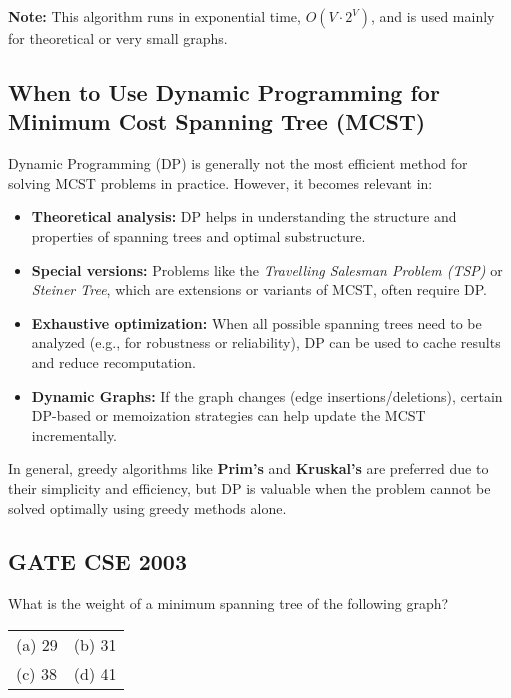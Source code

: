 \documentclass[a4paper,14pt]{extarticle}
\begin{document}
\vspace{1em}
\textbf{Note:} This algorithm runs in exponential time, \(O(V \cdot 2^V)\), and is used mainly for theoretical or very small graphs.

\newpage
\subsection{When to Use Dynamic Programming for Minimum Cost Spanning Tree (MCST)}

Dynamic Programming (DP) is generally not the most efficient method for solving MCST problems in practice. However, it becomes relevant in:

\begin{itemize}
    \item \textbf{Theoretical analysis:} DP helps in understanding the structure and properties of spanning trees and optimal substructure.
    \item \textbf{Special versions:} Problems like the \textit{Travelling Salesman Problem (TSP)} or \textit{Steiner Tree}, which are extensions or variants of MCST, often require DP.
    \item \textbf{Exhaustive optimization:} When all possible spanning trees need to be analyzed (e.g., for robustness or reliability), DP can be used to cache results and reduce recomputation.
    \item \textbf{Dynamic Graphs:} If the graph changes (edge insertions/deletions), certain DP-based or memoization strategies can help update the MCST incrementally.
\end{itemize}

\noindent
In general, greedy algorithms\cite{edmonds1971} like \textbf{Prim’s} and \textbf{Kruskal’s} are preferred due to their simplicity and efficiency, but DP is valuable when the problem cannot be solved optimally using greedy methods alone.

\newpage
\subsection{GATE CSE 2003}

What is the weight of a minimum spanning tree of the following graph?



\begin{tabular}{ll}
(a) 29 \hspace{4cm} & (b) 31 \\
(c) 38 \hspace{4cm} & (d) 41 \\
\end{tabular}
\end{document}
